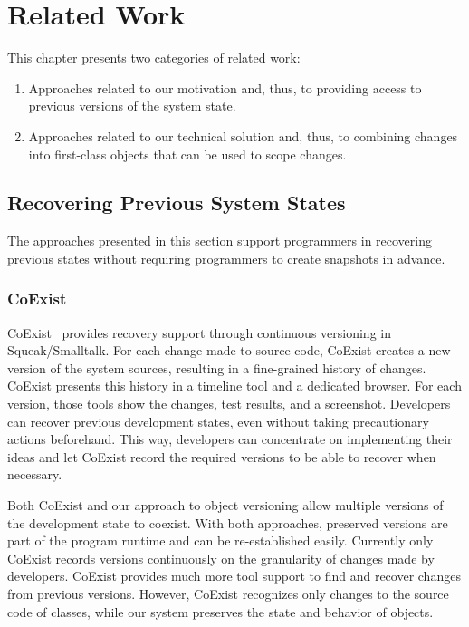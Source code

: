 \chapter{Related Work} \label{chapter:RELATED_WORK}

This chapter presents two categories of related work:

\begin{enumerate}
    \item Approaches related to our motivation and, thus, to providing access to previous versions of the system state.
    \item Approaches related to our technical solution and, thus, to combining changes into first-class objects that can be used to scope changes.
\end{enumerate}


\section{Recovering Previous System States}

The approaches presented in this section support programmers in recovering previous states without requiring programmers to create snapshots in advance.


\subsection{CoExist}

CoExist~\cite{Steinert2012COE} provides recovery support through continuous versioning in Squeak/Smalltalk.
For each change made to source code, CoExist creates a new version of the system sources, resulting in a fine-grained history of changes.
CoExist presents this history in a timeline tool and a dedicated browser.
For each version, those tools show the changes, test results, and a screenshot.
Developers can recover previous development states, even without taking precautionary actions beforehand.
This way, developers can concentrate on implementing their ideas and let CoExist record the required versions to be able to recover when necessary.

Both CoExist and our approach to object versioning allow multiple versions of the development state to coexist.
With both approaches, preserved versions are part of the program runtime and can be re-established easily.
Currently only CoExist records versions continuously on the granularity of changes made by developers.
CoExist provides much more tool support to find and recover changes from previous versions.
However, CoExist recognizes only changes to the source code of classes, while our system preserves the state and behavior of objects.


